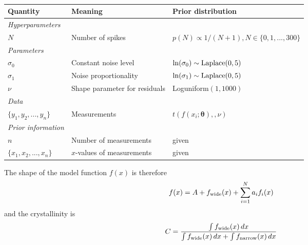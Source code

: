 \documentclass[a4paper, 12pt]{article}
\newcommand{\params}{\boldsymbol{\theta}}
\begin{document}
\begin{table}
\centering
\begin{tabular}{|lll|}
\hline
{\bf Quantity}      &   {\bf Meaning}   &  {\bf Prior distribution}\\
\hline
{\em Hyperparameters} & &\\
$N$     &   Number of spikes    &  $p(N) \propto 1/(N+1), N \in \{0, 1, ..., 300\}$\\
\hline
{\em Parameters}& &\\
$\sigma_0$ &    Constant noise level  &   $\ln(\sigma_0) \sim \textnormal{Laplace}(0,5)$\\
$\sigma_1$ &    Noise proportionality   &  $\ln(\sigma_1) \sim \textnormal{Laplace}(0,5)$ \\
$\nu$     &   Shape parameter for residuals   &   Loguniform$(1, 1000)$\\
\hline
{\em Data}&&\\
\hline
$\{y_1, y_2, ..., y_n\}$  &   Measurements    & $t(f(x_i; \params), ,\nu)$\\
\hline
{\em Prior information}&&\\
\hline
$n$ & Number of measurements & given\\
$\{x_1, x_2, ..., x_n\}$  & $x$-values of measurements & given \\

\hline
\end{tabular}
\caption{\label{tab:priors}}
\end{table}


The shape of the model function $f(x)$ is therefore
\begin{align}
f(x) &= A + f_{\rm wide}(x) + \sum_{i=1}^N a_i f_i(x)
\end{align}
and the crystallinity is
\begin{align}
C &= \frac{\int f_{\rm wide}(x) \, dx}
          {\int f_{\rm wide}(x) \, dx + \int f_{\rm narrow}(x) \, dx}
\end{align}




\end{document}
